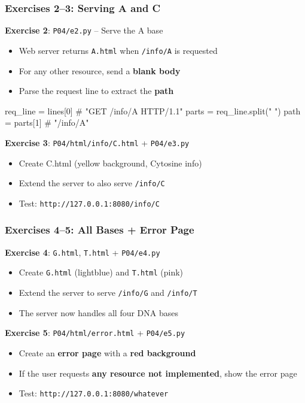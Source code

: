 \documentclass[xcolor=table]{beamer}
\begin{document}
\begin{frame}[fragile]
\frametitle{Exercises 2--3: Serving A and C}

\textbf{Exercise 2}: \texttt{P04/e2.py} -- Serve the A base
\begin{itemize}
\item Web server returns \texttt{A.html} when \texttt{/info/A} is requested
\item For any other resource, send a \textbf{blank body}
\item Parse the request line to extract the \textbf{path}
\end{itemize}

\vspace{0.1cm}

\begin{python}
req_line = lines[0]  # "GET /info/A HTTP/1.1"
parts = req_line.split(" ")
path = parts[1]      # "/info/A"
\end{python}

\vspace{0.2cm}

\textbf{Exercise 3}: \texttt{P04/html/info/C.html} + \texttt{P04/e3.py}
\begin{itemize}
\item Create C.html (yellow background, Cytosine info)
\item Extend the server to also serve \texttt{/info/C}
\item Test: \texttt{http://127.0.0.1:8080/info/C}
\end{itemize}

\end{frame}

\begin{frame}
\frametitle{Exercises 4--5: All Bases + Error Page}

\textbf{Exercise 4}: \texttt{G.html}, \texttt{T.html} + \texttt{P04/e4.py}
\begin{itemize}
\item Create \texttt{G.html} (lightblue) and \texttt{T.html} (pink)
\item Extend the server to serve \texttt{/info/G} and \texttt{/info/T}
\item The server now handles all four DNA bases
\end{itemize}

\vspace{0.4cm}

\textbf{Exercise 5}: \texttt{P04/html/error.html} + \texttt{P04/e5.py}
\begin{itemize}
\item Create an \textbf{error page} with a \textbf{red background}
\item If the user requests \textbf{any resource not implemented}, show the error page
\item Test: \texttt{http://127.0.0.1:8080/whatever}
\end{itemize}

\end{frame}
\end{document}
